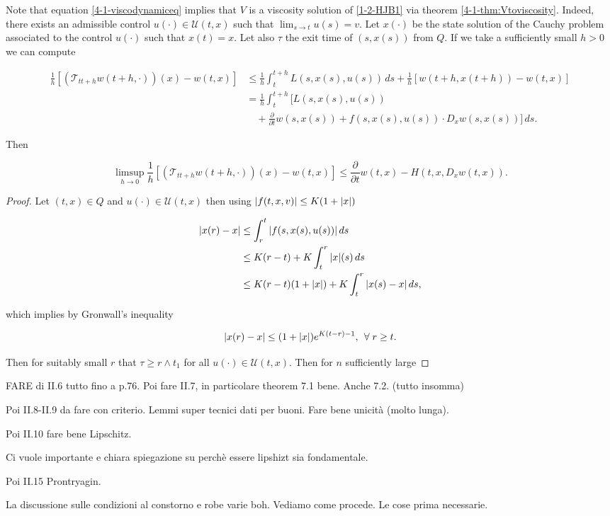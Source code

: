 \vspace{5mm}


Note that equation \ref{4-1-viscodynamiceq} implies that $V$ is a viscosity solution of \ref{1-2-HJB1} via theorem \ref{4-1-thm:Vtoviscosity}. Indeed, 
there exists an admissible control $u(\cdot)\in \mathcal{U}(t,x)$ such that $\lim_{s\to t}u(s)=v$. Let $x(\cdot)$ be the state solution of the Cauchy problem associated 
to the control $u(\cdot)$ such that $x(t)=x$. Let also $\tau$ the exit time of $(s,x(s))$ from $Q$. If we take a sufficiently small $h>0$ we can compute

\begin{align*}
    \frac{1}{h}\left[(\mathcal{T}_{tt+h}w(t+h,\cdot))(x)-w(t,x)\right] & \leq \frac{1}{h}\int_t^{t+h}L(s,x(s),u(s))\,ds + \frac{1}{h}\left[w(t+h,x(t+h))-w(t,x)\right] \\
    & =  \frac{1}{h}\int_t^{t+h}\bigg[L(s,x(s),u(s)) \\ 
    & \quad + \frac{\partial}{\partial t}w(s,x(s)) + f(s,x(s),u(s))\cdot D_xw(s,x(s))\bigg]\,ds.
\end{align*}

Then 

\[\limsup_{h\to0}\frac{1}{h}\left[(\mathcal{T}_{tt+h}w(t+h,\cdot))(x)-w(t,x)\right]\leq\frac{\partial}{\partial t}w(t,x) - H(t,x,D_xw(t,x)).\]

\vspace{5mm}

\begin{proof}

    Let $(t,x)\in Q$ and $u(\cdot)\in\mathcal{U}(t,x)$ then using $\abs{f(t,x,v)}\leq K(1+\abs{x})$

    \begin{align*}
        \abs{x(r)-x} & \leq \int_r^t \abs{f(s,x(s),u(s))} \,ds \\
        & \leq K(r-t) + K\int_t^r \abs{x}(s)\,ds \\
        & \leq K(r-t)(1+\abs{x}) + K\int_t^r \abs{x(s)-x}\,ds,
    \end{align*}

    which implies by Gronwall's inequality 

    \[\abs{x(r)-x} \leq (1+\abs{x})e^{K(t-r)-1},\,\forall r\geq t.\]

    Then for suitably small $r$ that $\tau\geq r\wedge t_1$ for all $u(\cdot)\in\mathcal{U}(t,x)$. Then for $n$ sufficiently large
\end{proof}



FARE di II.6 tutto fino a p.76. Poi fare II.7, in particolare theorem 7.1 bene. Anche 7.2. (tutto insomma)

Poi II.8-II.9 da fare con criterio. Lemmi super tecnici dati per buoni. Fare bene unicità (molto lunga).

Poi II.10 fare bene Lipschitz.

Ci vuole importante e chiara spiegazione su perchè essere lipshizt sia fondamentale.

Poi II.15 Prontryagin.

La discussione sulle condizioni al constorno e robe varie boh. Vediamo come procede. Le cose prima necessarie.  